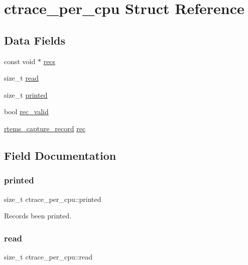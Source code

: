 \hypertarget{structctrace__per__cpu}{}\section{ctrace\+\_\+per\+\_\+cpu Struct Reference}
\label{structctrace__per__cpu}
\subsection*{Data Fields}
\begin{DoxyCompactItemize}
\item 
const void $\ast$ \mbox{\hyperlink{structctrace__per__cpu_ac22b798cd7df56f63d667365f11ff2fc}{recs}}
\item 
size\+\_\+t \mbox{\hyperlink{structctrace__per__cpu_ade81e5a8b2b15ff8d3cca386b9732c88}{read}}
\item 
size\+\_\+t \mbox{\hyperlink{structctrace__per__cpu_ad38aa737e89324feebf64cef6cd98f3b}{printed}}
\item 
bool \mbox{\hyperlink{structctrace__per__cpu_a15bfce7ed37b3471213d39d3c6576d08}{rec\+\_\+valid}}
\item 
\mbox{\hyperlink{structrtems__capture__record}{rtems\+\_\+capture\+\_\+record}} \mbox{\hyperlink{structctrace__per__cpu_a23d0e1fac8bb2448b41de09fa07f5b1c}{rec}}
\end{DoxyCompactItemize}


\subsection{Field Documentation}
\mbox{\label{structctrace__per__cpu_ad38aa737e89324feebf64cef6cd98f3b}} 
\subsubsection{\texorpdfstring{printed}{printed}}
{\footnotesize\ttfamily size\+\_\+t ctrace\+\_\+per\+\_\+cpu\+::printed}

Records been printed. \mbox{\label{structctrace__per__cpu_ade81e5a8b2b15ff8d3cca386b9732c88}} 
\subsubsection{\texorpdfstring{read}{read}}
{\footnotesize\ttfamily size\+\_\+t ctrace\+\_\+per\+\_\+cpu\+::read}

